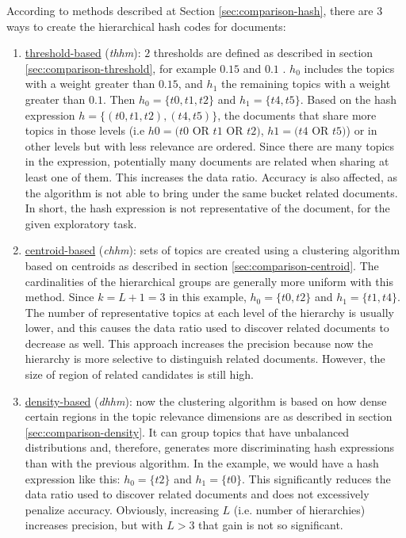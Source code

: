 According to methods described at Section \ref{sec:comparison-hash}, there are 3 ways to create the hierarchical hash codes for documents:
\begin{enumerate}
\item \underline{threshold-based} (\textit{thhm}): $2$ thresholds are defined as described in section \ref{sec:comparison-threshold}, for example $0.15$ and $0.1$ . $h_0$ includes the topics with a weight greater than $0.15$, and $h_1$ the remaining topics with a weight greater than $0.1$. Then $h_0=\{t0,t1,t2\}$ and $h_1=\{t4,t5\}$. Based on the hash expression $h=\{(t0,t1,t2),(t4,t5)\}$, the documents that share more topics in those levels (i.e $h0=(t0$ OR $t1$ OR $t2)$, $h1=(t4$ OR $t5)$) or in other levels but with less relevance are ordered. Since there are many topics in the expression, potentially many documents are related when sharing at least one of them. This increases the data ratio. Accuracy is also affected, as the algorithm is not able to bring under the same bucket related documents. In short, the hash expression is not representative of the document, for the given exploratory task.
\item \underline{centroid-based} (\textit{chhm}): sets of topics are created using a clustering algorithm based on centroids as described in section \ref{sec:comparison-centroid}. The cardinalities of the hierarchical groups are generally more uniform with this method. Since $k=L+1=3$ in this example, $h_0=\{t0,t2\}$ and $h_1=\{t1,t4\}$. The number of representative topics at each level of the hierarchy is usually lower, and this causes the data ratio used to discover related documents to decrease as well. This approach increases the precision because now the hierarchy is more selective to distinguish related documents. However, the size of region of related candidates is still high.
\item \underline{density-based} (\textit{dhhm}): now the clustering algorithm is based on how dense certain regions in the topic relevance dimensions are as described in section \ref{sec:comparison-density}. It can group topics that have unbalanced distributions and, therefore, generates more discriminating hash expressions than with the previous algorithm. In the example, we would have a hash expression like this: $h_0=\{t2\}$ and $h_1=\{t0\}$. This significantly reduces the data ratio used to discover related documents and does not excessively penalize accuracy. Obviously, increasing $L$ (i.e. number of hierarchies) increases precision, but with $L>3$ that gain is not so significant.
\end{enumerate}

